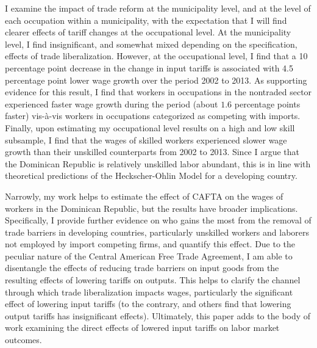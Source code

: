 \documentclass[12pt]{article}
\begin{document}
I examine the impact of trade reform at the municipality level, and at the level of each occupation
within a municipality, with the expectation that I will find clearer effects of tariff changes at
the occupational level. At the municipality level, I find insignificant, and somewhat mixed depending
on the specification, effects of trade liberalization. However, at the occupational level, 
I find that a 10 percentage point decrease in the change in input tariffs is associated with 4.5 
percentage point lower wage growth over the period 2002 to 2013. As supporting evidence for this result, I find that
workers in occupations in the nontraded sector experienced faster wage growth during the period 
(about $1.6$ percentage points faster) vis-\`{a}-vis workers in occupations categorized as competing with 
imports. Finally, upon estimating my occupational level results on a high and low skill subsample, 
I find  that the wages of skilled workers experienced slower wage growth than their unskilled 
counterparts from 2002 to 2013. Since I argue that the Dominican Republic is relatively unskilled labor
abundant, this is in line with theoretical predictions of the Heckscher-Ohlin Model 
for a developing country.

Narrowly, my work helps to estimate the effect of CAFTA on the wages of workers in the 
Dominican Republic, but the results have broader implications. Specifically, 
I provide further evidence on who gains the most from the removal of trade barriers in developing
countries, particularly unskilled workers and laborers not employed by import competing firms,
and quantify this effect. Due to the peculiar nature
of the Central American Free Trade Agreement, I am able to disentangle the effects
of reducing trade barriers on input goods from the resulting effects of lowering tariffs on outputs.
This helps to clarify the channel through which trade liberalization impacts wages, particularly
the significant effect of lowering input tariffs (to the contrary, \citet{amiti2012trade} and others 
find that lowering output tariffs has insignificant effects). 
Ultimately, this paper adds to the body of work examining the direct effects of lowered 
input  tariffs on labor market outcomes.
\end{document}
